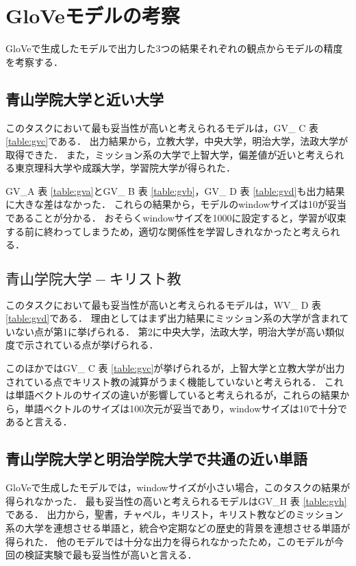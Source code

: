 \section{GloVeモデルの考察}
GloVeで生成したモデルで出力した3つの結果それぞれの観点からモデルの精度を考察する．

\subsection{青山学院大学と近い大学}
このタスクにおいて最も妥当性が高いと考えられるモデルは，GV\_ C 表 \ref{table:gvc}である．
出力結果から，立教大学，中央大学，明治大学，法政大学が取得できた．
また，ミッション系の大学で上智大学，偏差値が近いと考えられる東京理科大学や成蹊大学，学習院大学が得られた．

GV\_A 表 \ref{table:gva}とGV\_ B 表 \ref{table:gvb}，GV\_ D 表 \ref{table:gvd}も出力結果に大きな差はなかった．
これらの結果から，モデルのwindowサイズは10が妥当であることが分かる．
おそらくwindowサイズを1000に設定すると，学習が収束する前に終わってしまうため，適切な関係性を学習しきれなかったと考えられる．

\subsection{$ 青山学院大学 - キリスト教 $}
このタスクにおいて最も妥当性が高いと考えられるモデルは，WV\_ D 表 \ref{table:gvd}である．
理由としてはまず出力結果にミッション系の大学が含まれていない点が第1に挙げられる．
第2に中央大学，法政大学，明治大学が高い類似度で示されている点が挙げられる．

このほかではGV\_ C 表 \ref{table:gvc}が挙げられるが，上智大学と立教大学が出力されている点でキリスト教の減算がうまく機能していないと考えられる．
これは単語ベクトルのサイズの違いが影響していると考えられるが，これらの結果から，単語ベクトルのサイズは100次元が妥当であり，windowサイズは10で十分であると言える．

\subsection{青山学院大学と明治学院大学で共通の近い単語}
GloVeで生成したモデルでは，windowサイズが小さい場合，このタスクの結果が得られなかった．
最も妥当性の高いと考えられるモデルはGV\_H 表 \ref{table:gvh}である．
出力から，聖書，チャペル，キリスト，キリスト教などのミッション系の大学を連想させる単語と，統合や定期などの歴史的背景を連想させる単語が得られた．
他のモデルでは十分な出力を得られなかったため，このモデルが今回の検証実験で最も妥当性が高いと言える．
